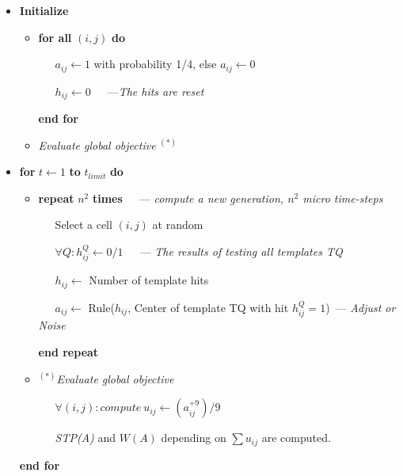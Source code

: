 \documentclass[10pt,a4paper]{article}  %
\begin{document}
\footnotesize
\begin{itemize}
	\item \textbf{Initialize}

	\begin{itemize}
		\item []
			\textbf{for all} $(i,j)$ \textbf{do}
			
			~~~$a_{ij}\leftarrow1$ with probability 1/4, else $a_{ij}\leftarrow0$
			
		  ~~~$h_{ij}\leftarrow0$~~~---\textit{The hits are reset}	
			
				
			\textbf{end for}
		
		\item[]
			\textit{Evaluate global objective }$^{(*)}$
	\end{itemize}
	
	\item
	\textbf{for} $t\leftarrow1$ \textbf{to} $t_{limit}$ \textbf{do}
	
	\begin{itemize}
		\item[] 
		
		\textbf{repeat} $n^2$ \textbf{times}~~~--- \textit{compute a new generation, $n^2$ micro time-steps}
    
    ~~~Select a cell $(i,j)$ at random
    
    ~~~$\forall Q: h^Q_{ij} \leftarrow 0/1$~~~--- \textit{The results of testing all templates TQ }
		 
		~~~$h_{ij} \leftarrow$ Number of template hits
		
		~~~$a_{ij} \leftarrow$ Rule($h_{ij}$, Center of template TQ with hit $h^Q_{ij}=1$)~--- \textit{Adjust or Noise}			
		
		\textbf{end repeat}					
						
		\item[] 	
     $^{(*)} $\textit{Evaluate global objective}
        
     ~~~$\forall (i,j): \textit{compute}~ u_{ij}\leftarrow(a_{ij}^{+9})/9$     
    
		~~~\textit{STP(A)} and $W(A)$ depending on $\sum u_{ij}$ are computed.
	\end{itemize}
		
\textbf{end for}		
	
\end{itemize}
\normalsize
\end{document}
